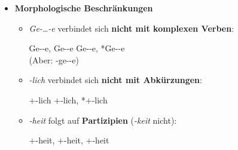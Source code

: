 \begin{frame}


\begin{itemize}
\item \textbf{Morphologische Beschränkungen}

\begin{itemize}
\item \emph{Ge-}{\dots}\emph{-e} verbindet sich \textbf{nicht mit komplexen Verben}:

\ea Ge--e, Ge--e \vs *Ge--e, *Ge--e\\
(Aber: -ge--e)
\z

\pause

\item \emph{-lich} verbindet sich \textbf{nicht mit Abkürzungen}:

\ea {}$+$-lich \vs *$+$-lich, *$+$-lich
\z

\pause 

\item \emph{-heit} folgt auf \textbf{Partizipien} (\emph{-keit} nicht):

\ea {}$+$-heit, $+$-heit, $+$-heit
\z

\end{itemize}

\end{itemize}

\end{frame}


